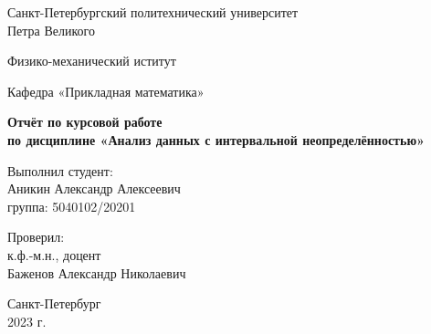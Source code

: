 \begin{titlepage}
	\begin{center}
		{\large Санкт-Петербургский политехнический университет\\Петра Великого\\}
	\end{center}
	
	\begin{center}
		{\large Физико-механический иститут}
	\end{center}
	
	
	\begin{center}
		{\large Кафедра «Прикладная математика»}
	\end{center}
	
	\vspace{8em}
	
	\begin{center}
		{\bfseries Отчёт по курсовой работе \\по дисциплине «Анализ данных с интервальной неопределённостью»}
	\end{center}
	
	\vspace{5em}
	
	\begin{flushleft}
		\hspace{16em}Выполнил студент:\\\hspace{16em}Аникин Александр Алексеевич\\\hspace{16em}группа: 5040102/20201
		
		\vspace{2em}
		
		\hspace{16em}Проверил:\\\hspace{16em}к.ф.-м.н., доцент\\\hspace{16em}Баженов Александр Николаевич
		
	\end{flushleft}
	
	
	\vspace{6em}
	
	
	\begin{center}
		Санкт-Петербург\\2023 г.
	\end{center}	
	
\end{titlepage}